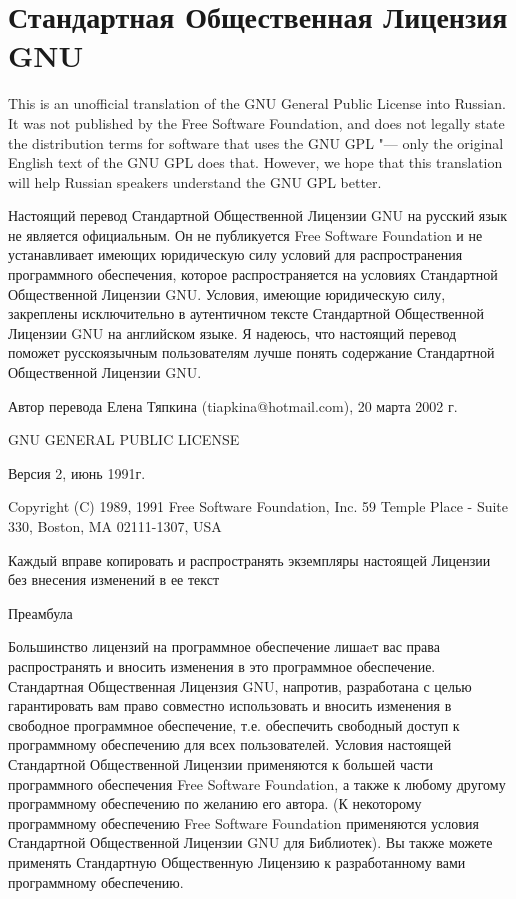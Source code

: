 \chapter{Стандартная Общественная Лицензия GNU}\label{gpl_appendix_ru}

\begin{small}
This is an unofficial translation of the GNU General Public License into
Russian. It was not published by the Free Software Foundation, and does
not legally state the distribution terms for software that uses the GNU
GPL "--- only the original English text of the GNU GPL does that. However,
we hope that this translation will help Russian speakers understand the
GNU GPL better.

Настоящий перевод Стандартной Общественной Лицензии GNU на русский язык
не является официальным. Он не публикуется Free Software Foundation и не
устанавливает имеющих юридическую силу условий для распространения
программного обеспечения, которое распространяется на условиях Стандартной
Общественной Лицензии GNU. Условия, имеющие юридическую силу, закреплены
исключительно в аутентичном тексте Стандартной Общественной Лицензии GNU
на английском языке. Я надеюсь, что настоящий перевод поможет
русскоязычным пользователям лучше понять содержание Стандартной
Общественной Лицензии GNU.

Автор перевода Елена Тяпкина (tiapkina@hotmail.com), 20 марта 2002 г.


\begin{center}
GNU GENERAL PUBLIC LICENSE

Версия 2, июнь 1991г.


Copyright (C) 1989, 1991 Free Software Foundation, Inc.
59 Temple Place - Suite 330, Boston, MA  02111-1307, USA


Каждый вправе копировать и распространять экземпляры настоящей Лицензии
без внесения изменений в ее текст
\end{center}
Преамбула

Большинство лицензий на программное обеспечение лишаeт вас права
распространять и вносить изменения в это программное обеспечение.
Стандартная Общественная Лицензия GNU, напротив, разработана с целью
гарантировать вам право совместно использовать и вносить изменения в
свободное программное обеспечение, т.е. обеспечить свободный доступ к
программному обеспечению для всех пользователей. Условия настоящей
Стандартной Общественной Лицензии применяются к большей части
программного обеспечения Free Software Foundation, а также к любому
другому программному обеспечению по желанию его автора. (К некоторому
программному обеспечению Free Software Foundation применяются условия
Стандартной Общественной Лицензии GNU для Библиотек). Вы также можете
применять Стандартную Общественную Лицензию к разработанному вами
программному обеспечению.


\end{small}
